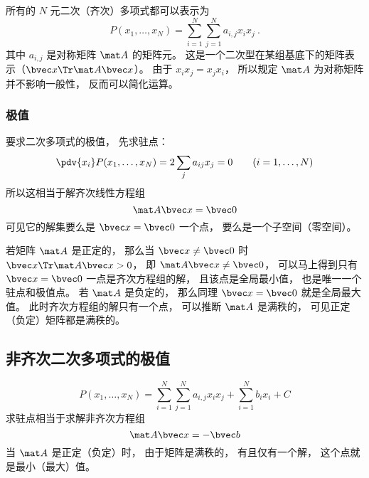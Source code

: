 

所有的 $N$ 元二次（齐次）多项式都可以表示为
\begin{equation}
P(x_1,\dots,x_N) = \sum_{i=1}^N\sum_{j=1}^N a_{i,j}x_i x_j~.
\end{equation}
其中 $a_{i,j}$ 是对称矩阵 $\mat A$ 的矩阵元。 这是一个二次型在某组基底下的矩阵表示（$\bvec x\Tr \mat A \bvec x$）。 由于 $x_i x_j = x_j x_i$， 所以规定 $\mat A$ 为对称矩阵并不影响一般性， 反而可以简化运算。

\subsubsection{极值}
要求二次多项式的极值， 先求驻点：
\begin{equation}
\pdv{x_i}P(x_1,\dots,x_N) = 2\sum_j a_{ij} x_j = 0 \qquad (i = 1,\dots,N)
\end{equation}
所以这相当于解齐次线性方程组
\begin{equation}
\mat A \bvec x = \bvec 0
\end{equation}
可见它的解集要么是 $\bvec x = \bvec 0$ 一个点， 要么是一个子空间（零空间）。

若矩阵 $\mat A$ 是正定的， 那么当 $\bvec x \ne \bvec 0$ 时 $\bvec x\Tr \mat A \bvec x > 0$， 即 $\mat A \bvec x \ne \bvec 0$， 可以马上得到只有 $\bvec x = \bvec 0$ 一点是齐次方程组的解， 且该点是全局最小值， 也是唯一一个驻点和极值点。 若 $\mat A$ 是负定的， 那么同理 $\bvec x = \bvec 0$ 就是全局最大值。 此时齐次方程组的解只有一个点， 可以推断 $\mat A$ 是满秩的， 可见正定（负定）矩阵都是满秩的。

\subsection{非齐次二次多项式的极值}
\begin{equation}
P(x_1,\dots,x_N) = \sum_{i=1}^N\sum_{j=1}^N a_{i,j}x_i x_j + \sum_{i=1}^N b_i x_i + C
\end{equation}
求驻点相当于求解非齐次方程组
\begin{equation}
\mat A \bvec x = -\bvec b
\end{equation}
当 $\mat A$ 是正定（负定）时， 由于矩阵是满秩的， 有且仅有一个解， 这个点就是最小（最大）值。
